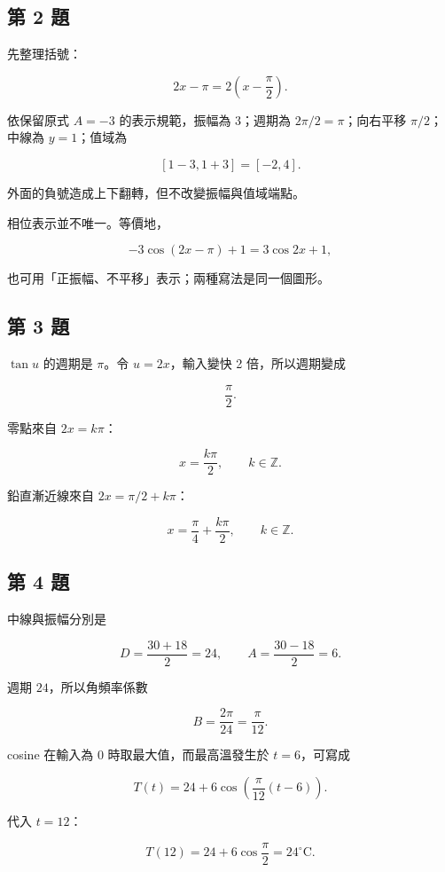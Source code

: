 \documentclass[11pt,a4paper]{article}
\begin{document}
\subsection{第 2 題}\label{ux7b2c-2-ux984c}

先整理括號：

\[
2x-\pi=2\left(x-\frac\pi2\right).
\]

依保留原式 \(A=-3\) 的表示規範，振幅為 \(3\)；週期為 \(2\pi/2=\pi\)；向右平移 \(\pi/2\)；中線為 \(y=1\)；值域為

\[
[1-3,1+3]=\boxed{[-2,4]}.
\]

外面的負號造成上下翻轉，但不改變振幅與值域端點。

相位表示並不唯一。等價地，

\[
-3\cos(2x-\pi)+1=3\cos2x+1,
\]

也可用「正振幅、不平移」表示；兩種寫法是同一個圖形。

\subsection{第 3 題}\label{ux7b2c-3-ux984c}

\(\tan u\) 的週期是 \(\pi\)。令 \(u=2x\)，輸入變快 2 倍，所以週期變成

\[
\boxed{\frac\pi2}.
\]

零點來自 \(2x=k\pi\)：

\[
\boxed{x=\frac{k\pi}{2}},\qquad k\in\mathbb Z.
\]

鉛直漸近線來自 \(2x=\pi/2+k\pi\)：

\[
\boxed{x=\frac\pi4+\frac{k\pi}{2}},\qquad k\in\mathbb Z.
\]

\subsection{第 4 題}\label{ux7b2c-4-ux984c}

中線與振幅分別是

\[
D=\frac{30+18}{2}=24,
\qquad
A=\frac{30-18}{2}=6.
\]

週期 \(24\)，所以角頻率係數

\[
B=\frac{2\pi}{24}=\frac\pi{12}.
\]

cosine 在輸入為 \(0\) 時取最大值，而最高溫發生於 \(t=6\)，可寫成

\[
\boxed{T(t)=24+6\cos\left(\frac\pi{12}(t-6)\right)}.
\]

代入 \(t=12\)：

\[
T(12)=24+6\cos\frac\pi2=\boxed{24^\circ\mathrm C}.
\]
\end{document}
